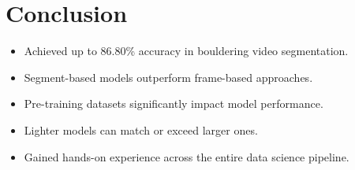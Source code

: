 \section{Conclusion}

\begin{frame}

    \vspace{1em}

    \begin{itemize}
        \itemsep1em
        \item Achieved up to 86.80\% accuracy in bouldering video segmentation.
        \item Segment-based models outperform frame-based approaches.
        \item Pre-training datasets significantly impact model performance.
        \item Lighter models can match or exceed larger ones.
        \item Gained hands-on experience across the entire data science pipeline.
    \end{itemize}
\end{frame}